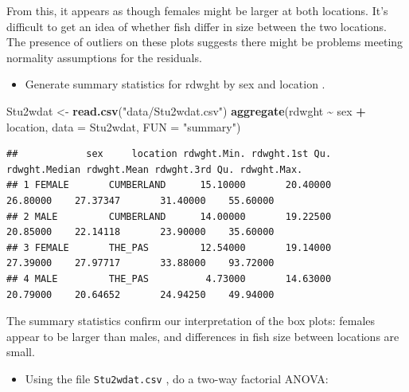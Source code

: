 \documentclass[
  12pt,
]{book}
\newenvironment{Shaded}{\begin{snugshade}}{\end{snugshade}}
\newcommand{\DataTypeTok}[1]{\textcolor[rgb]{0.13,0.29,0.53}{#1}}
\newcommand{\KeywordTok}[1]{\textcolor[rgb]{0.13,0.29,0.53}{\textbf{#1}}}
\newcommand{\NormalTok}[1]{#1}
\newcommand{\OperatorTok}[1]{\textcolor[rgb]{0.81,0.36,0.00}{\textbf{#1}}}
\newcommand{\StringTok}[1]{\textcolor[rgb]{0.31,0.60,0.02}{#1}}
\providecommand{\tightlist}{%
  \setlength{\itemsep}{0pt}\setlength{\parskip}{0pt}}
\begin{document}
From this, it appears as though females might be larger at both locations. It's difficult to get an idea of whether fish differ in size between the two locations. The presence of outliers on these plots suggests there might be problems meeting normality assumptions for the residuals.

\begin{itemize}
\tightlist
\item
  Generate summary statistics for rdwght by sex and location .
\end{itemize}

\begin{Shaded}
\begin{Highlighting}[]
\NormalTok{Stu2wdat \textless{}{-}}\StringTok{ }\KeywordTok{read.csv}\NormalTok{(}\StringTok{"data/Stu2wdat.csv"}\NormalTok{)}
\KeywordTok{aggregate}\NormalTok{(rdwght }\OperatorTok{\textasciitilde{}}\StringTok{ }\NormalTok{sex }\OperatorTok{+}\StringTok{ }\NormalTok{location, }\DataTypeTok{data =}\NormalTok{ Stu2wdat, }\DataTypeTok{FUN =} \StringTok{"summary"}\NormalTok{)}
\end{Highlighting}
\end{Shaded}

\begin{verbatim}
##            sex     location rdwght.Min. rdwght.1st Qu. rdwght.Median rdwght.Mean rdwght.3rd Qu. rdwght.Max.
## 1 FEMALE       CUMBERLAND      15.10000       20.40000      26.80000    27.37347       31.40000    55.60000
## 2 MALE         CUMBERLAND      14.00000       19.22500      20.85000    22.14118       23.90000    35.60000
## 3 FEMALE       THE_PAS         12.54000       19.14000      27.39000    27.97717       33.88000    93.72000
## 4 MALE         THE_PAS          4.73000       14.63000      20.79000    20.64652       24.94250    49.94000
\end{verbatim}

The summary statistics confirm our interpretation of the box plots: females appear to be larger than males, and differences in fish size between locations are small.

\begin{itemize}
\tightlist
\item
  Using the file \texttt{Stu2wdat.csv} , do a two-way factorial ANOVA:
\end{itemize}
\end{document}
